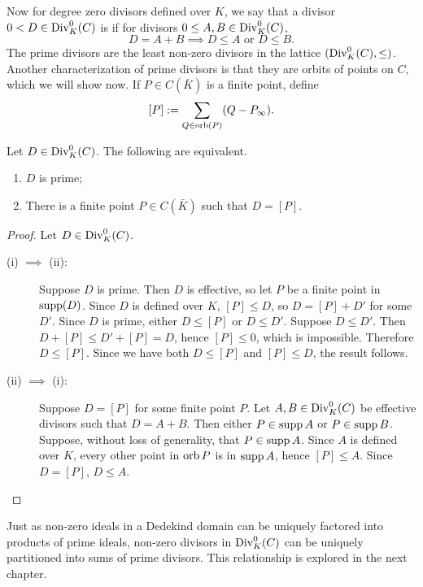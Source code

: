 Now for degree zero divisors defined over $K$, we say that a divisor $0 < D \in \operatorname{Div}_K^0(C)$ is 
if for divisors $0 \leq A, B \in \operatorname{Div}_K^0(C)$,
  \[ D = A + B \implies D \leq A \text{ or } D \leq B. \]
The prime divisors are the least non-zero divisors in the lattice $(\operatorname{Div}_K^0(C), \leq)$.
Another characterization of prime divisors is that they are orbits of points on $C$, which we will show now.
If $P \in C(\bar K)$ is a finite point, define
\[ [P] := \sum_{Q \in \operatorname{orb}(P)}(Q - P_\infty). \]
\begin{proposition}
  \label{prop_prime_divisors}
  Let $D \in \operatorname{Div}_K^0(C)$. The following are equivalent.
  \begin{enumerate}[label=(\roman*)]
    \item $D$ is prime;
    \item There is a finite point $P \in C(\bar K)$ such that $D = [P]$.
  \end{enumerate}
\end{proposition}
\begin{proof}
  Let $D \in \operatorname{Div}_K^0(C)$.
  \begin{description}
    \item[(i) $\implies$ (ii):]
      Suppose $D$ is prime.
      Then $D$ is effective, so let $P$ be a finite point in $\operatorname{supp}(D)$.
      Since $D$ is defined over $K$, $[P] \leq D$, so $D = [P] + D'$ for some $D'$.
      Since $D$ is prime, either $D \leq [P]$ or $D \leq D'$.
      Suppose $D \leq D'$.
      Then $D + [P] \leq D' + [P] = D$, hence $[P] \leq 0$, which is impossible.
      Therefore $D \leq [P]$.
      Since we have both $D \leq [P]$ and $[P] \leq D$, the result follows.
      
    \item[(ii) $\implies$ (i):]
      Suppose $D = [P]$ for some finite point $P$.
      Let $A, B \in \operatorname{Div}_K^0(C)$ be effective divisors such that $D = A + B$.
      Then either $P \in \operatorname{supp} A$ or $P \in \operatorname{supp} B$.
      Suppose, without loss of generality, that $P \in \operatorname{supp} A$.
      Since $A$ is defined over $K$, every other point in $\operatorname{orb} P$ is in $\operatorname{supp} A$, hence $[P] \leq A$.
      Since $D = [P]$, $D \leq A$.
  \end{description}
\end{proof}

Just as non-zero ideals in a Dedekind domain can be uniquely factored into products of prime ideals,
non-zero divisors in $\operatorname{Div}_K^0(C)$ can be uniquely partitioned into sums of prime divisors.
This relationship is explored in the next chapter.
